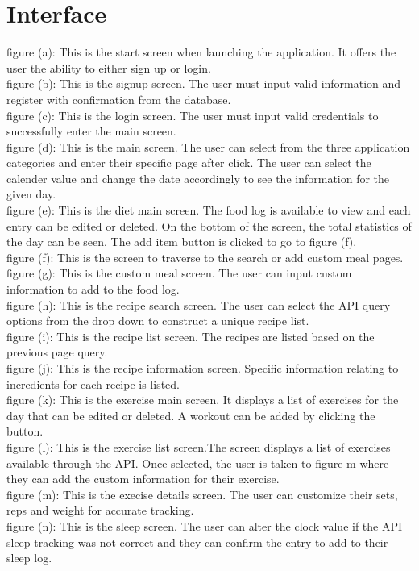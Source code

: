 \documentclass[12pt, titlepage]{article}
\begin{document}
% 

\newpage{}

\appendix

\section{Interface}

figure (a): This is the start screen when launching the application. It offers the user the ability to either sign up or login.
\\figure (b): This is the signup screen. The user must input valid information and register with confirmation from the database.
\\figure (c): This is the login screen. The user must input valid credentials to successfully enter the main screen.
\\figure (d): This is the main screen. The user can select from the three application categories and enter their specific page after click. The user can select the calender value and change the date accordingly to see the information for the given day.
\\figure (e): This is the diet main screen. The food log is available to view and each entry can be edited or deleted. On the bottom of the screen, the total statistics of the day can be seen. The add item button is clicked to go to figure (f).
\\figure (f): This is the screen to traverse to the search or add custom meal pages.
\\figure (g): This is the custom meal screen. The user can input custom information to add to the food log.
\\figure (h): This is the recipe search screen. The user can select the API query options from the drop down to construct a unique recipe list.
\\figure (i): This is the recipe list screen. The recipes are listed based on the previous page query. 
\\figure (j): This is the recipe information screen. Specific information relating to incredients for each recipe is listed.
\\figure (k): This is the exercise main screen. It displays a list of exercises for the day that can be edited or deleted. A workout can be added by clicking the button.
\\figure (l): This is the exercise list screen.The screen displays a list of exercises available through the API. Once selected, the user is taken to figure m where they can add the custom information for their exercise. 
\\figure (m): This is the execise details screen. The user can customize their sets, reps and weight for accurate tracking.
\\figure (n): This is the sleep screen. The user can alter the clock value if the API sleep tracking was not correct and they can confirm the entry to add to their sleep log. 
\end{document}
